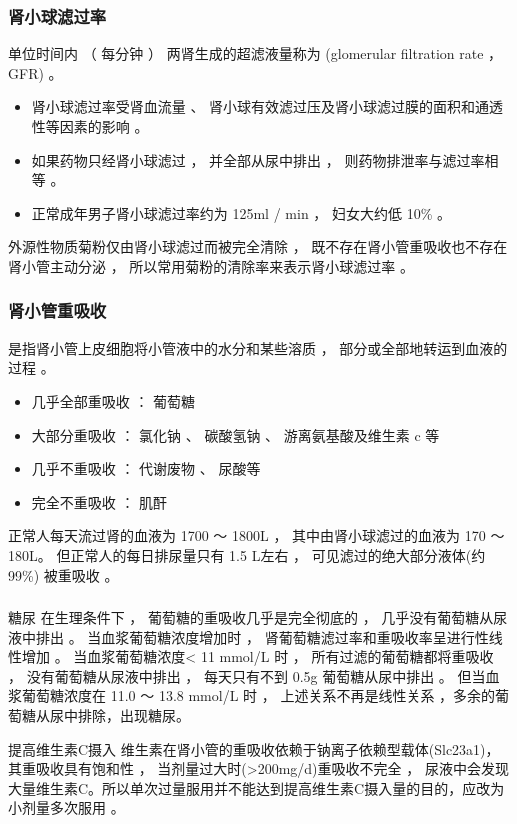\documentclass[dvipsnames, svgnames, x11names]{beamer}
\begin{document}
\begin{frame}
    \frametitle{肾小球滤过率}
    单位时间内 （ 每分钟 ） 两肾生成的超滤液量称为 (glomerular filtration rate ，GFR) 。 
    \begin{itemize}
      \item 肾小球滤过率受肾血流量 、 肾小球有效滤过压及肾小球滤过膜的面积和通透性等因素的影响 。 
      \item 如果药物只经肾小球滤过 ， 并全部从尿中排出 ， 则药物排泄率与滤过率相等 。
      \item 正常成年男子肾小球滤过率约为 125ml / min ， 妇女大约低 10\% 。
    \end{itemize}
    \begin{blankblock}{}
        外源性物质菊粉仅由肾小球滤过而被完全清除 ， 既不存在肾小管重吸收也不存在肾小管主动分泌 ， 所以常用菊粉的清除率来表示肾小球滤过率 。 
    \end{blankblock}
\end{frame}


\begin{frame}
    \frametitle{肾小管重吸收}
    是指肾小管上皮细胞将小管液中的水分和某些溶质 ， 部分或全部地转运到血液的过程 。
    \begin{itemize}
      \item 几乎全部重吸收 ： 葡萄糖
      \item 大部分重吸收 ： 氯化钠 、 碳酸氢钠 、 游离氨基酸及维生素 c 等
      \item 几乎不重吸收 ： 代谢废物 、 尿酸等
      \item 完全不重吸收 ： 肌酐 %
    \end{itemize}
    \begin{blankblock}{}
        正常人每天流过肾的血液为 1700 ～ 1800L ， 其中由肾小球滤过的血液为 170 ～ 180L。 但正常人的每日排尿量只有 1.5 L左右 ， 可见滤过的绝大部分液体(约 99\%) 被重吸收 。
    \end{blankblock}
\end{frame}


\begin{frame}
    \frametitle{}
    \begin{block}{糖尿}
        在生理条件下 ， 葡萄糖的重吸收几乎是完全彻底的 ， 几乎没有葡萄糖从尿液中排出 。 当血浆葡萄糖浓度增加时 ， 肾葡萄糖滤过率和重吸收率呈进行性线性增加 。 当血浆葡萄糖浓度< 11 mmol/L 时 ， 所有过滤的葡萄糖都将重吸收 ， 没有葡萄糖从尿液中排出 ， 每天只有不到 0.5g 葡萄糖从尿中排出 。 但当血浆葡萄糖浓度在 11.0 ～ 13.8 mmol/L 时 ， 上述关系不再是线性关系 ，多余的葡萄糖从尿中排除，出现糖尿。
    \end{block}
    \begin{block}{提高维生素C摄入}
        维生素在肾小管的重吸收依赖于钠离子依赖型载体(Slc23a1)， 其重吸收具有饱和性 ， 当剂量过大时(>200mg/d)重吸收不完全 ， 尿液中会发现大量维生素C。所以单次过量服用并不能达到提高维生素C摄入量的目的，应改为小剂量多次服用 。
    \end{block}
\end{frame}
\end{document}
